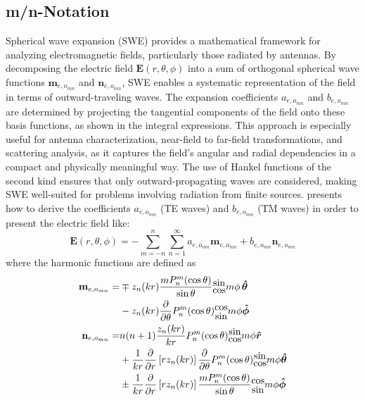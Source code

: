 \documentclass{article}
\begin{document}
\subsection{m/n-Notation}
Spherical wave expansion (SWE) provides a mathematical framework for analyzing electromagnetic fields, particularly those radiated by antennas. By decomposing the electric field \(\mathbf{E}(r, \theta, \phi)\) into a sum of orthogonal spherical wave functions \(\mathbf{m}_{e,o_{mn}}\) and \(\mathbf{n}_{e,o_{mn}}\), SWE enables a systematic representation of the field in terms of outward-traveling waves. The expansion coefficients \(a_{e,o_{mn}}\) and \(b_{e,o_{mn}}\) are determined by projecting the tangential components of the field onto these basis functions, as shown in the integral expressions. This approach is especially useful for antenna characterization, near-field to far-field transformations, and scattering analysis, as it captures the field's angular and radial dependencies in a compact and physically meaningful way. The use of Hankel functions of the second kind ensures that only outward-propagating waves are considered, making SWE well-suited for problems involving radiation from finite sources. \citet{Ludwig1971NearfieldFT} presents how to derive the coefficients \(a_{e,o_{mn}}\) (TE waves) and \(b_{e,o_{mn}}\) (TM waves) in order to present the electric field like:
\begin{equation}
    \mathbf{E}(r,\theta,\phi)=-\sum_{m=-n}^n \sum_{n=1}^\infty a_{e,o_{mn}} \mathbf{m}_{e,o_{mn}} + b_{e,o_{mn}} \mathbf{n}_{e,o_{mn}}
\end{equation}
where the harmonic functions are defined as
\begin{equation}
    \begin{split}
        \mathbf{m}_{e,o_{mn}} =& \mp z_n(kr) \frac{m P_n^m(\cos \theta)}{\sin \theta} \stackanchor{$\sin$}{$\cos$} m \phi \, \boldsymbol{\hat{\theta}} \\
        &- z_n(kr) \frac{\partial}{\partial \theta} P_n^m(\cos \theta)\stackanchor{$\cos$}{$\sin$}m\phi \boldsymbol{\hat{\phi}}\\
        \mathbf{n}_{e,o_{mn}} =& n(n+1) \frac{z_n(kr)}{kr} P_n^m(\cos \theta)\stackanchor{$\sin$}{$\cos$} m \phi \boldsymbol{\hat{r}} \\
        &+ \frac{1}{kr} \frac{\partial}{\partial r} \left[ r z_n(kr) \right] \frac{\partial}{\partial \theta} P_n^m(\cos \theta)\stackanchor{$\sin$}{$\cos$} m \phi \boldsymbol{\hat{\theta}} \\
        &\pm \frac{1}{k r} \frac{\partial}{\partial r} \left[r z_n(k r) \right] \frac{m P_n^m(\cos \theta)}{\sin \theta}\stackanchor{$\cos$}{$\sin$} m \phi \boldsymbol{\hat{\phi}}
    \end{split}
\end{equation}
\end{document}
